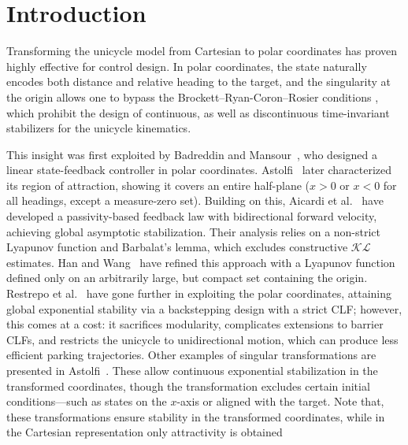 \documentclass[letterpaper, 10 pt, conference]{ieeeconf}  %
\begin{document}

\section{Introduction}
Transforming the unicycle model from Cartesian to polar coordinates has proven highly effective for control design. In polar coordinates, the state naturally encodes both distance and relative heading to the target, and the singularity at the origin allows one to bypass the Brockett–Ryan-Coron–Rosier conditions \cite{brockett1983asymptotic,coron1994relation, ryan1994brockett}, which prohibit the design of continuous, as well as discontinuous time-invariant stabilizers for the unicycle kinematics.

This insight was first exploited by Badreddin and Mansour~\cite{badreddin1993fuzzy}, who designed a linear state-feedback controller in polar coordinates. Astolfi~\cite{astolfi1999exponential} later characterized its region of attraction, showing it covers an entire half-plane ($x>0$ or $x<0$ for all headings, except a measure-zero set).
Building on this, Aicardi et al.~\cite{aicardi1995} have developed a passivity-based feedback law with bidirectional forward velocity, achieving global asymptotic stabilization. Their analysis relies on a non-strict Lyapunov function and Barbalat’s lemma, which excludes constructive $\mathcal{KL}$ estimates. Han and Wang~\cite{wang24_force_controlled_safestable} have refined this approach with a Lyapunov function defined only on an arbitrarily large, but compact set containing the origin. Restrepo et al.~\cite{restrepo2020leader} have gone further in exploiting the polar coordinates, attaining global exponential stability via a backstepping design with a strict CLF; however, this comes at a cost: it sacrifices modularity, complicates extensions to barrier CLFs, and restricts the unicycle to unidirectional motion, which can produce less efficient parking trajectories.
Other examples of singular transformations are presented in Astolfi~\cite{astolfi1995exponential,astolfi1996discontinuous}. These allow continuous exponential stabilization in the transformed coordinates, though the transformation excludes certain initial conditions—such as states on the $x$-axis or aligned with the target.
Note that, these transformations ensure stability in the transformed coordinates, while in the Cartesian representation only attractivity is obtained
\end{document}
